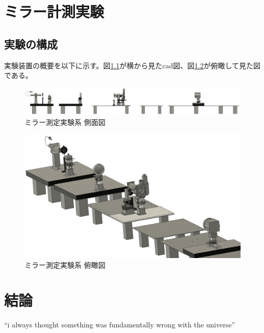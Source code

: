 \documentclass[dvipdfmx,autodetect-engine]{jreport}
\begin{document}
\chapter{ミラー計測実験}
\minitoc

\newpage
\section{実験の構成}
実験装置の概要を以下に示す。図\ref{fig:mirror_experiment_asm_cad_side}が横から見たcad図、図\ref{fig:mirror_experiment_asm_cad_isometric}が俯瞰して見た図である。

\begin{figure}[h!]
\centering
\includegraphics[scale=0.25]{images/mirror_experiment/setup/asm_total_side.png}
\caption{ミラー測定実験系 側面図}
\label{fig:mirror_experiment_asm_cad_side}
\end{figure}

\begin{figure}[h!]
\centering
\includegraphics[scale=0.25]{images/mirror_experiment/setup/asm_total_isometric.png}
\caption{ミラー測定実験系 俯瞰図}
\label{fig:mirror_experiment_asm_cad_isometric}
\end{figure}

\newpage
\chapter{結論}
\minitoc

\newpage
``i always thought something was fundamentally wrong with the universe'' \citep{adams1995hitchhiker}
\end{document}
